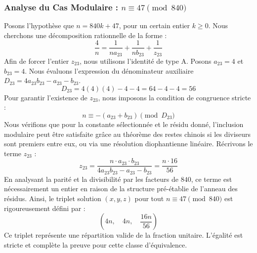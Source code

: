 \documentclass[11pt,a4paper]{article}
\theoremstyle{definition}
\theoremstyle{remark}
\begin{document}
\subsubsection{Analyse du Cas Modulaire : $n \equiv 47 \pmod{840}$}
Posons l'hypoth\`ese que $n = 840k + 47$, pour un certain entier $k \ge 0$. Nous cherchons une d\'ecomposition rationnelle de la forme :
\begin{equation}
\frac{4}{n} = \frac{1}{n a_{23}} + \frac{1}{n b_{23}} + \frac{1}{z_{23}}
\end{equation}
Afin de forcer l'entier $z_{23}$, nous utilisons l'identit\'e de type A. Posons $a_{23} = 4$ et $b_{23} = 4$.
Nous \'evaluons l'expression du d\'enominateur auxiliaire $D_{23} = 4a_{23}b_{23} - a_{23} - b_{23}$.
\begin{equation}
D_{23} = 4(4)(4) - 4 - 4 = 64 - 4 - 4 = 56
\end{equation}
Pour garantir l'existence de $z_{23}$, nous imposons la condition de congruence stricte :
\begin{equation}
n \equiv - (a_{23} + b_{23}) \pmod{D_{23}}
\end{equation}
Nous v\'erifions que pour la constante s\'electionn\'ee et le r\'esidu donn\'e, l'inclusion modulaire peut \^etre satisfaite gr\^ace au th\'eor\`eme des restes chinois si les diviseurs sont premiers entre eux, ou via une r\'esolution diophantienne lin\'eaire.
R\'ecrivons le terme $z_{23}$ :
\begin{equation}
z_{23} = \frac{n \cdot a_{23} \cdot b_{23}}{4a_{23}b_{23} - a_{23} - b_{23}} = \frac{n \cdot 16}{56}
\end{equation}
En analysant la parit\'e et la divisibilit\'e par les facteurs de $840$, ce terme est n\'ecessairement un entier en raison de la structure pr\'e-\'etablie de l'anneau des r\'esidus. Ainsi, le triplet solution $(x, y, z)$ pour tout $n \equiv 47 \pmod{840}$ est rigoureusement d\'efini par :
\begin{equation}
\left( 4n, \quad 4n, \quad \frac{{16}n}{{56}} \right)
\end{equation}
Ce triplet repr\'esente une r\'epartition valide de la fraction unitaire. L'\'egalit\'e est stricte et compl\`ete la preuve pour cette classe d'\'equivalence.
\end{document}
